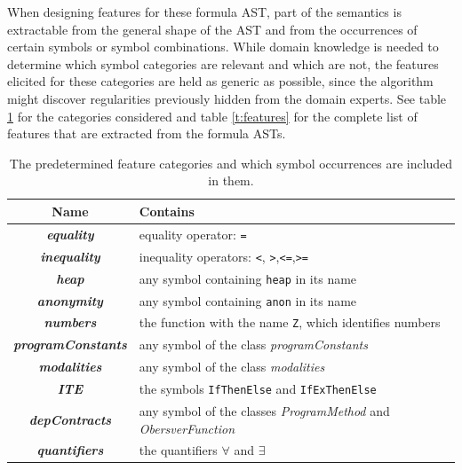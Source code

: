 \documentclass[runningheads,a4paper]{llncs}
\begin{document}
When designing features for these formula AST, part of the semantics is extractable from the general shape of the AST and from the occurrences of certain symbols or symbol combinations. While domain knowledge is needed to determine which symbol categories are relevant and which are not, the features elicited for these categories are held as generic as possible, since the algorithm might discover regularities previously hidden from the domain experts. See table \ref{t:categories} for the categories considered and table \ref{t:features} for the complete list of features that are extracted from the formula ASTs.

\begin{table}[!htb]
	\begin{tabularx}{\textwidth}{ |c|X| } \hline
		Name & Contains \\ \hline \hline
		
		\textbf{\textit{equality}} & equality operator: \texttt{=} \\ \hline
		\textbf{\textit{inequality}} & inequality operators: \texttt{<}, \texttt{>},\texttt{<=},\texttt{>=} \\ \hline
		\textbf{\textit{heap}} & any symbol containing \texttt{heap} in its name \\ \hline
		\textbf{\textit{anonymity}} & any symbol containing \texttt{anon} in its name \\ \hline
		\textbf{\textit{numbers}} & the function with the name \texttt{Z}, which identifies numbers \\ \hline
		\textbf{\textit{programConstants}} & any symbol of the class \textit{programConstants} \\ \hline
		\textbf{\textit{modalities}} & any symbol of the class \textit{modalities} \\ \hline
		\textbf{\textit{ITE}} & the symbols \texttt{IfThenElse} and \texttt{IfExThenElse} \\ \hline
		\textbf{\textit{depContracts}} & any symbol of the classes \textit{ProgramMethod} and \textit{ObersverFunction} \\ \hline
		\textbf{\textit{quantifiers}} & the quantifiers $\forall$ and $\exists$ \\ \hline
	\end{tabularx}
\vspace*{2pt}
\caption{The predetermined feature categories and which symbol occurrences are included in them.}
\label{t:categories}
\end{table}
\end{document}
